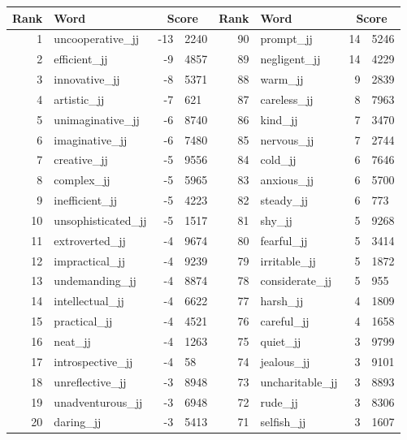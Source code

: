 \begin{table}[tbp]
    \begin{tabular}{| rlr@{.}l | rlr@{.}l |}
    \hline
    \textbf{Rank} & \textbf{Word} & \multicolumn{2}{c|}{\textbf{Score}} & \textbf{Rank} & \textbf{Word} & \multicolumn{2}{c|}{\textbf{Score}} \\
    \hline
    1 & uncooperative\_jj & -13 & 2240    &    90 & prompt\_jj & 14 & 5246 \\
    2 & efficient\_jj & -9 & 4857    &    89 & negligent\_jj & 14 & 4229 \\
    3 & innovative\_jj & -8 & 5371    &    88 & warm\_jj & 9 & 2839 \\
    4 & artistic\_jj & -7 & 621    &    87 & careless\_jj & 8 & 7963 \\
    5 & unimaginative\_jj & -6 & 8740    &    86 & kind\_jj & 7 & 3470 \\
    6 & imaginative\_jj & -6 & 7480    &    85 & nervous\_jj & 7 & 2744 \\
    7 & creative\_jj & -5 & 9556    &    84 & cold\_jj & 6 & 7646 \\
    8 & complex\_jj & -5 & 5965    &    83 & anxious\_jj & 6 & 5700 \\
    9 & inefficient\_jj & -5 & 4223    &    82 & steady\_jj & 6 & 773 \\
    10 & unsophisticated\_jj & -5 & 1517    &    81 & shy\_jj & 5 & 9268 \\
    11 & extroverted\_jj & -4 & 9674    &    80 & fearful\_jj & 5 & 3414 \\
    12 & impractical\_jj & -4 & 9239    &    79 & irritable\_jj & 5 & 1872 \\
    13 & undemanding\_jj & -4 & 8874    &    78 & considerate\_jj & 5 & 955 \\
    14 & intellectual\_jj & -4 & 6622    &    77 & harsh\_jj & 4 & 1809 \\
    15 & practical\_jj & -4 & 4521    &    76 & careful\_jj & 4 & 1658 \\
    16 & neat\_jj & -4 & 1263    &    75 & quiet\_jj & 3 & 9799 \\
    17 & introspective\_jj & -4 & 58    &    74 & jealous\_jj & 3 & 9101 \\
    18 & unreflective\_jj & -3 & 8948    &    73 & uncharitable\_jj & 3 & 8893 \\
    19 & unadventurous\_jj & -3 & 6948    &    72 & rude\_jj & 3 & 8306 \\
    20 & daring\_jj & -3 & 5413    &    71 & selfish\_jj & 3 & 1607 \\

\end{tabular}
\end{table}
